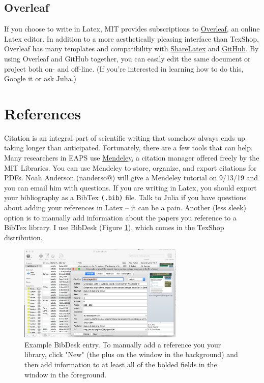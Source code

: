 \documentclass{article}
\begin{document}
\subsection*{Overleaf}
If you choose to write in Latex, MIT provides subscriptions to \href{https://www.overleaf.com}{Overleaf}, an online Latex editor. In addition to a more aesthetically pleasing interface than TexShop, Overleaf has many templates and compatibility with \href{https://www.sharelatex.com}{ShareLatex} and
\href{https://github.com}{GitHub}. By using Overleaf and GitHub together, you can easily edit the same document or project both on- and off-line. (If you're interested in learning how to do this, Google it or ask Julia.)

\section*{References}
Citation is an integral part of scientific writing that somehow always ends up taking longer than anticipated. Fortunately, there are a few tools that can help. Many researchers in EAPS use \href{https://libguides.mit.edu/cite-write/mendeley#s-lg-box-wrapper-18620527}{Mendeley}, a citation manager offered freely by the MIT Libraries. You can use Mendeley to store, organize, and export citations for PDFs. Noah Anderson (nanderso@) will give a Mendeley tutorial on 9/13/19 and you can email him with questions. If you are writing in Latex, you should export your bibliography as a BibTex \texttt{(.bib)} file. Talk to Julia if you have questions about adding your references in Latex -- it can be a pain. Another (less sleek) option is to manually add information about the papers you reference to a BibTex library. I use BibDesk (Figure \ref{fig:bib}), which comes in the TexShop distribution. 

\begin{figure}[h!]
    \centering
    \includegraphics[width=0.7\textwidth]{bibdesk.png}
    \caption{Example BibDesk entry. To manually add a reference you your library, click "New" (the plus on the window in the background) and then add information to at least all of the bolded fields in the window in the foreground.}
    \label{fig:bib}
\end{figure}
\end{document}
